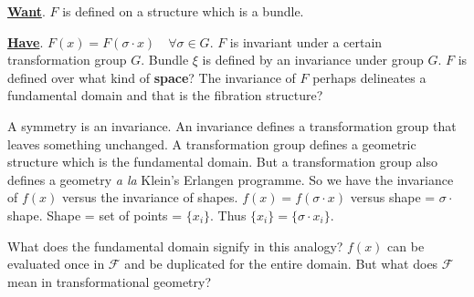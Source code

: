 \begin{preview}
\begin{minipage}{\textwidth}
\textbf{\uline{Want}}.  $F$ is defined on a structure which is a bundle.

\textbf{\uline{Have}}.  $ F(x) = F(\sigma \cdot x) \quad \forall \sigma \in G $. $F$ is invariant under a certain transformation group $G$.  Bundle $\xi$ is defined by an invariance under group $G$.  $F$ is defined over what kind of \textbf{space}?  The invariance of $F$ perhaps delineates a fundamental domain and that is the fibration structure?

A symmetry is an invariance.  An invariance defines a transformation group that leaves something unchanged.  A transformation group defines a geometric structure which is the fundamental domain. But a transformation group also defines a geometry \textit{a la} Klein's Erlangen programme. So we have the invariance of $f(x)$ versus the invariance of shapes.  $f(x) = f(\sigma \cdot x)$ versus shape = $ \sigma \cdot$ shape.  Shape = set of points = $\{ x_i \}$. Thus $\{ x_i \} = \{ \sigma \cdot x_i \}$.

What does the fundamental domain signify in this analogy?  $f(x)$ can be evaluated once in $\mathcal{F}$ and be duplicated for the entire domain.  But what does $\mathcal{F}$ mean in transformational geometry?  

\end{minipage}
\end{preview}

